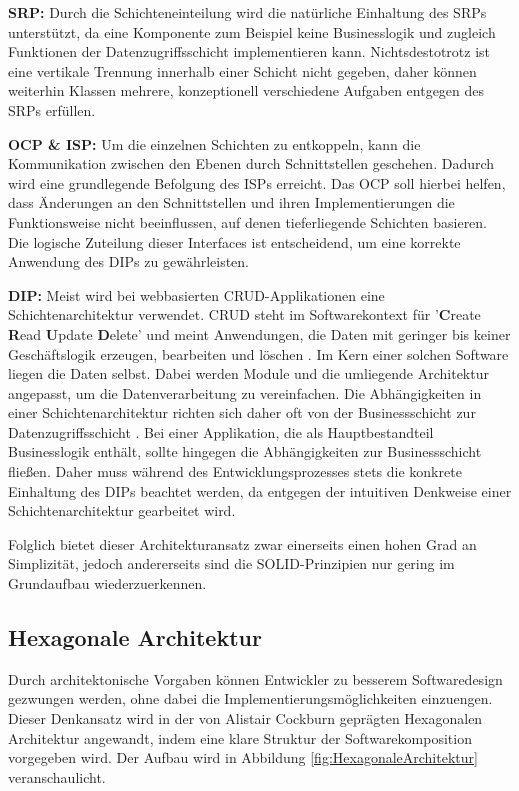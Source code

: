 \textbf{\acrlong{SRP}:} Durch die Schichteneinteilung wird die natürliche Einhaltung des \acrshort{SRP}s unterstützt, da eine Komponente zum Beispiel keine Businesslogik und zugleich Funktionen der Datenzugriffsschicht implementieren kann. Nichtsdestotrotz ist eine vertikale Trennung innerhalb einer Schicht nicht gegeben, daher können weiterhin Klassen mehrere, konzeptionell verschiedene Aufgaben entgegen des SRPs erfüllen. 

\textbf{\acrlong{OCP} \& \acrlong{ISP}:} Um die einzelnen Schichten zu entkoppeln, kann die Kommunikation zwischen den Ebenen durch Schnittstellen geschehen. Dadurch wird eine grundlegende Befolgung des \acrshort{ISP}s erreicht. Das \acrlong{OCP} soll hierbei helfen, dass Änderungen an den Schnittstellen und ihren Implementierungen die Funktionsweise nicht beeinflussen, auf denen tieferliegende Schichten basieren. Die logische Zuteilung dieser Interfaces ist entscheidend, um eine korrekte Anwendung des \acrlong{DIP}s zu gewährleisten. 

\textbf{\acrlong{DIP}:} Meist wird bei webbasierten CRUD-Applikationen eine Schichtenarchitektur verwendet. \acrshort{CRUD} steht im Softwarekontext für '\textbf{C}reate \textbf{R}ead \textbf{U}pdate \textbf{D}elete' und meint Anwendungen, die Daten mit geringer bis keiner Geschäftslogik erzeugen, bearbeiten und löschen \cite[S. 381]{Martin.1980}. Im Kern einer solchen Software liegen die Daten selbst. Dabei werden Module und die umliegende Architektur angepasst, um die Datenverarbeitung zu vereinfachen. Die Abhängigkeiten in einer Schichtenarchitektur richten sich daher oft von der Businessschicht zur Datenzugriffsschicht \cite{Layered.SOLID}. Bei einer Applikation, die als Hauptbestandteil Businesslogik enthält, sollte hingegen die Abhängigkeiten zur Businessschicht fließen. Daher muss während des Entwicklungsprozesses stets die konkrete Einhaltung des DIPs beachtet werden, da entgegen der intuitiven Denkweise einer Schichtenarchitektur gearbeitet wird. 

Folglich bietet dieser Architekturansatz zwar einerseits einen hohen Grad an Simplizität, jedoch andererseits sind die SOLID-Prinzipien nur gering im Grundaufbau wiederzuerkennen. 

\pagebreak

\subsection{Hexagonale Architektur}

Durch architektonische Vorgaben können Entwickler zu besserem Softwaredesign gezwungen werden, ohne dabei die Implementierungsmöglichkeiten einzuengen. Dieser Denkansatz wird in der von Alistair Cockburn geprägten Hexagonalen Architektur angewandt, indem eine klare Struktur der Softwarekomposition vorgegeben wird. Der Aufbau wird in Abbildung \ref{fig:HexagonaleArchitektur} veranschaulicht. \\

